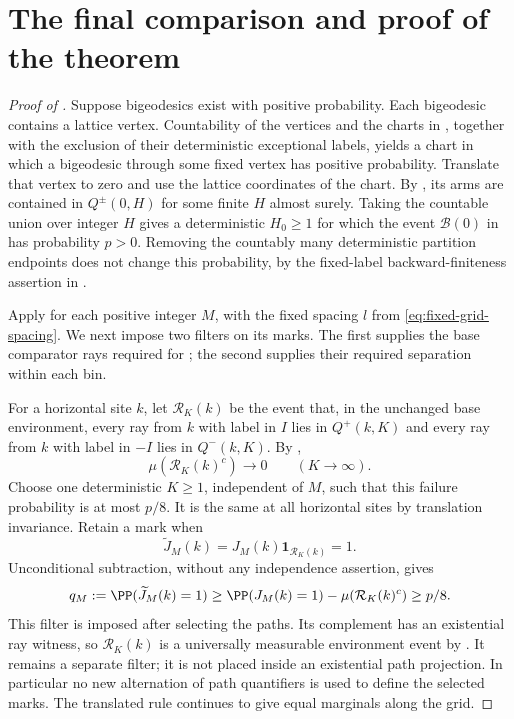 \section{The final comparison and proof of the theorem}\label{sec:conclusion}

\begin{proof}[Proof of ]
Suppose bigeodesics exist with positive probability.  Each bigeodesic
contains a lattice vertex.  Countability of the vertices and the charts
in , together with the exclusion of their deterministic
exceptional labels, yields a chart in which a bigeodesic through some
fixed vertex has positive probability.  Translate that vertex to zero
and use the lattice coordinates of the chart.  By , its
arms are contained in $Q^\pm(0,H)$ for some finite $H$ almost surely.
Taking the countable union over integer $H$ gives a deterministic
$H_0\geq1$ for which the event $\mathcal B(0)$ in  has
probability $p>0$.  Removing the countably many deterministic partition
endpoints does not change this probability, by the fixed-label
backward-finiteness assertion in .

Apply  for each positive integer $M$, with the
fixed spacing $l$ from \eqref{eq:fixed-grid-spacing}.  We next impose
two filters on its marks.  The first supplies the base comparator rays
required for ; the second supplies their
required separation within each bin.

For a horizontal site $k$, let $\mathcal R_K(k)$ be the event that, in
the unchanged base environment, every ray from $k$ with label in $I$
lies in $Q^+(k,K)$ and every ray from $k$ with label in $-I$ lies in
$Q^-(k,K)$.  By ,
\[
 \mu(\mathcal R_K(k)^c)\longrightarrow0\qquad(K\longrightarrow\infty).
\]
Choose one deterministic $K\geq1$, independent of $M$, such that this
failure probability is at most $p/8$.  It is the same at all horizontal
sites by translation invariance.  Retain a mark when
\[
 \widetilde J_M(k)=J_M(k)\mathbf1_{\mathcal R_K(k)}=1.
\]
Unconditional subtraction, without any independence assertion, gives
\begin{equation}\label{eq:retained-mark-probability}
 q_M:=\PP(\widetilde J_M(k)=1)
 \geq\PP(J_M(k)=1)-\mu(\mathcal R_K(k)^c)
 \geq p/8.
\end{equation}
This filter is imposed after selecting the paths.  Its complement has
an existential ray witness, so $\mathcal R_K(k)$ is a universally
measurable environment event by .  It remains a
separate filter; it is not placed inside an existential path projection.
In particular no new alternation of path quantifiers is used to define
the selected marks.  The translated rule continues to give equal
marginals along the grid.


\end{proof}
